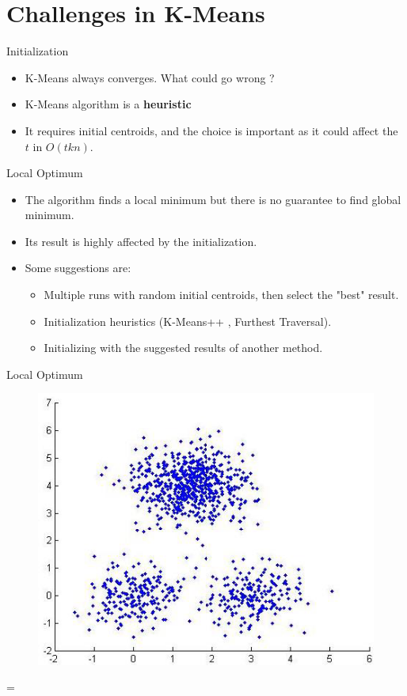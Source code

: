 \documentclass[serif, aspectratio=169]{beamer}
\begin{document}
\section{Challenges in K-Means}


\begin{frame}{Initialization}
    \begin{itemize}
    
        \item K-Means always converges. What could go wrong ?
        \item K-Means algorithm is a \textbf{heuristic}
        \item It requires initial centroids, and
the choice is important as it could
affect the $t$ in $O(tkn)$.

    \end{itemize}
\end{frame}

\begin{frame}{Local Optimum}
    \begin{itemize}
        \item The algorithm finds a local minimum but there is no guarantee to find global minimum.
        \item Its result is highly affected by the initialization.
        \item Some suggestions are:
        \begin{itemize}
            \item  Multiple runs with random initial centroids, then select the "best" result.
            \item Initialization heuristics (K-Means++ , Furthest Traversal).
            \item Initializing with the suggested results of another method.
        \end{itemize}
    \end{itemize}
\end{frame}

\begin{frame}{Local Optimum}
 
        \begin{figure}
            \centering
            \includegraphics[scale=0.55]{pic/original_data.png}
        \end{figure}
    =
\end{frame}
\end{document}
